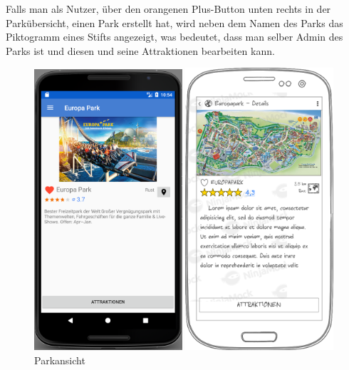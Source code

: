 Falls man als Nutzer, über den orangenen Plus-Button unten rechts in der Parkübersicht, einen Park erstellt hat, wird neben dem Namen des Parks das Piktogramm eines Stifts angezeigt, was bedeutet, dass man selber Admin des Parks ist und diesen und seine Attraktionen bearbeiten kann. \\

\begin{figure}[h]
    \centering
    \begin{minipage}{0.49\textwidth}
        \centering
        \includegraphics[width=0.49\textwidth, trim=150 200 200 200, 
        clip]{img/screenshots/ss_parkdetail.png}
        \caption{Parkansicht}
		\label{figure:implementierungparkansicht}
    \end{minipage}
    \begin{minipage}{0.49\textwidth}
        \centering
        \includegraphics[width=0.49\textwidth]{img/mockups/m_park_detail.png}

\end{minipage}
\end{figure}

